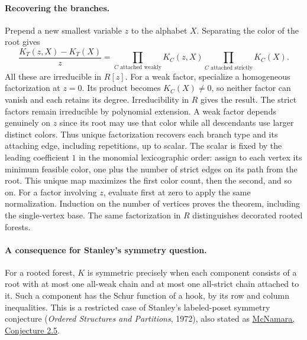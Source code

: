 \documentclass[11pt]{article}
\begin{document}
\paragraph{Recovering the branches.}
Prepend a new smallest variable $z$ to the alphabet $X$. Separating the color of the root gives
\[
 \frac{K_T(z,X)-K_T(X)}z
  =\prod_{C\text{ attached weakly}} K_C(z,X)
   \prod_{C\text{ attached strictly}} K_C(X).
\]
All these are irreducible in $R[z]$. For a weak factor, specialize a homogeneous factorization at $z=0$. Its product becomes $K_C(X)\ne0$, so neither factor can vanish and each retains its degree. Irreducibility in $R$ gives the result. The strict factors remain irreducible by polynomial extension. A weak factor depends genuinely on $z$ since its root may use that color while all descendants use larger distinct colors. Thus unique factorization recovers each branch type and its attaching edge, including repetitions, up to scalar. The scalar is fixed by the leading coefficient $1$ in the monomial lexicographic order: assign to each vertex its minimum feasible color, one plus the number of strict edges on its path from the root. This unique map maximizes the first color count, then the second, and so on. For a factor involving $z$, evaluate first at zero to apply the same normalization. Induction on the number of vertices proves the theorem, including the single-vertex base. The same factorization in $R$ distinguishes decorated rooted forests.

\paragraph{A consequence for Stanley's symmetry question.}
For a rooted forest, $K$ is symmetric precisely when each component consists of a root with at most one all-weak chain and at most one all-strict chain attached to it. Such a component has the Schur function of a hook, by its row and column inequalities. This is a restricted case of Stanley's labeled-poset symmetry conjecture (\emph{Ordered Structures and Partitions}, 1972), also stated as \href{https://arxiv.org/abs/math/0410301}{McNamara, Conjecture 2.5}.
\end{document}
